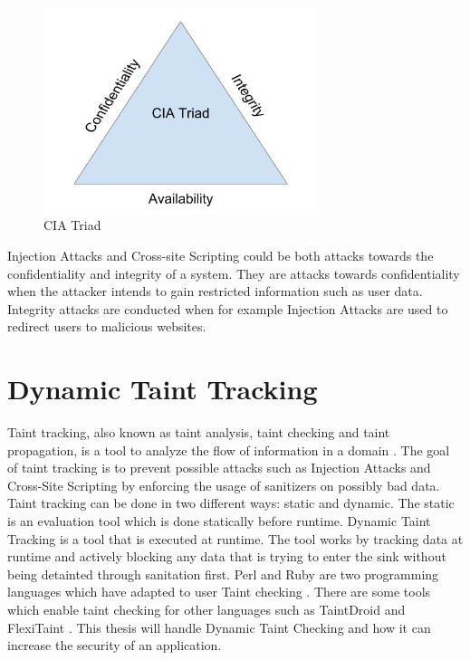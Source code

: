\begin{figure}
    \centering
    \includegraphics[height=6cm]{images/CIATriad.jpg}
    \caption{CIA Triad}
    \label{fig:CIATriad}
\end{figure}

Injection Attacks and Cross-site Scripting could be both attacks towards the confidentiality and integrity of a system. They are attacks towards confidentiality when the attacker intends to gain restricted information such as user data. Integrity attacks are conducted when for example Injection Attacks are used to redirect users to malicious websites.


\section{Dynamic Taint Tracking}
\label{DynamicTaintTracking}
Taint tracking, also known as taint analysis, taint checking and taint propagation, is a tool to analyze the flow of information in a domain \parencite{Pan2015}. The goal of taint tracking is to prevent possible attacks such as Injection Attacks and Cross-Site Scripting by enforcing the usage of sanitizers on possibly bad data. Taint tracking can be done in two different ways: static and dynamic. The static is an evaluation tool which is done statically before runtime. Dynamic Taint Tracking is a tool that is executed at runtime. The tool works by tracking data at runtime and actively blocking any data that is trying to enter the sink without being detainted through sanitation first. Perl and Ruby are two programming languages which have adapted to user Taint checking \parencite{perl, ruby}. There are some tools which enable taint checking for other languages such as TaintDroid \parencite{Ma2010} and FlexiTaint \parencite{Venkataramani2008}. This thesis will handle Dynamic Taint Checking and how it can increase the security of an application.


